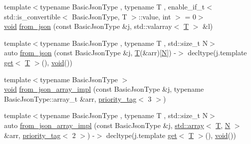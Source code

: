 \begin{DoxyCompactItemize}
\item 
{\footnotesize template$<$typename Basic\+Json\+Type , typename T , enable\+\_\+if\+\_\+t$<$ std\+::is\+\_\+convertible$<$ Basic\+Json\+Type, T $>$\+::value, int $>$  = 0$>$ }\\\mbox{\hyperlink{namespacenlohmann_1_1detail_a59fca69799f6b9e366710cb9043aa77d}{void}} \mbox{\hyperlink{namespacenlohmann_1_1detail_a3df497b1d3977f071b488ecac1401517}{from\+\_\+json}} (const Basic\+Json\+Type \&j, std\+::valarray$<$ \mbox{\hyperlink{_keyboard_event_8h_adf1f3edb9115acb0a1e04209b7a9937b}{T}} $>$ \&l)
\item 
{\footnotesize template$<$typename Basic\+Json\+Type , typename T , std\+::size\+\_\+t N$>$ }\\auto \mbox{\hyperlink{namespacenlohmann_1_1detail_a7deb2db8eed6f1762373dde7a6595760}{from\+\_\+json}} (const Basic\+Json\+Type \&j, \mbox{\hyperlink{_keyboard_event_8h_adf1f3edb9115acb0a1e04209b7a9937b}{T}}(\&arr)\mbox{[}\mbox{\hyperlink{_keyboard_event_8h_a8cc2e7240164328fdc3f0e5e21032c56}{N}}\mbox{]}) -\/$>$ decltype(j.\+template \mbox{\hyperlink{namespacenlohmann_1_1detail_acc422c11342b31368f610b6f96fcedc6}{get}}$<$ \mbox{\hyperlink{_keyboard_event_8h_adf1f3edb9115acb0a1e04209b7a9937b}{T}} $>$(), \mbox{\hyperlink{namespacenlohmann_1_1detail_a59fca69799f6b9e366710cb9043aa77d}{void}}())
\item 
{\footnotesize template$<$typename Basic\+Json\+Type $>$ }\\\mbox{\hyperlink{namespacenlohmann_1_1detail_a59fca69799f6b9e366710cb9043aa77d}{void}} \mbox{\hyperlink{namespacenlohmann_1_1detail_a40f7bb070a60e8ba14fffb9c117fcbd8}{from\+\_\+json\+\_\+array\+\_\+impl}} (const Basic\+Json\+Type \&j, typename Basic\+Json\+Type\+::array\+\_\+t \&arr, \mbox{\hyperlink{structnlohmann_1_1detail_1_1priority__tag}{priority\+\_\+tag}}$<$ 3 $>$)
\item 
{\footnotesize template$<$typename Basic\+Json\+Type , typename T , std\+::size\+\_\+t N$>$ }\\auto \mbox{\hyperlink{namespacenlohmann_1_1detail_aba0ce45ebb69fd2c7132a00f9a56b503}{from\+\_\+json\+\_\+array\+\_\+impl}} (const Basic\+Json\+Type \&j, \mbox{\hyperlink{namespacenlohmann_1_1detail_a1ed8fc6239da25abcaf681d30ace4985af1f713c9e000f5d3f280adbd124df4f5}{std\+::array}}$<$ \mbox{\hyperlink{_keyboard_event_8h_adf1f3edb9115acb0a1e04209b7a9937b}{T}}, \mbox{\hyperlink{_keyboard_event_8h_a8cc2e7240164328fdc3f0e5e21032c56}{N}} $>$ \&arr, \mbox{\hyperlink{structnlohmann_1_1detail_1_1priority__tag}{priority\+\_\+tag}}$<$ 2 $>$) -\/$>$ decltype(j.\+template \mbox{\hyperlink{namespacenlohmann_1_1detail_acc422c11342b31368f610b6f96fcedc6}{get}}$<$ \mbox{\hyperlink{_keyboard_event_8h_adf1f3edb9115acb0a1e04209b7a9937b}{T}} $>$(), \mbox{\hyperlink{namespacenlohmann_1_1detail_a59fca69799f6b9e366710cb9043aa77d}{void}}())

\end{DoxyCompactItemize}

